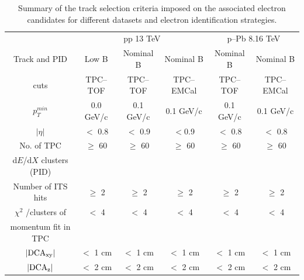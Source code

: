 \begin{table}[h]
\caption{Summary of the track selection criteria imposed on the associated electron candidates for different datasets and electron identification strategies.}

\centering
\small
\begin{tabular}{c |c c c | c c}
\hline\hline

 & \multicolumn{3}{c|}{pp 13 TeV} & \multicolumn{2}{c}{p--Pb 8.16 TeV}  \\ 
 Track and PID  & Low B & Nominal B  & Nominal B & Nominal B & Nominal B \\
  cuts & TPC--TOF & TPC--TOF  & TPC--EMCal & TPC--TOF & TPC--EMCal \\
\hline 
$p_{T}^{min}$ & 0.0 GeV/c   &{ 0.1 GeV/c}&   { 0.1 GeV/c}& 0.1 GeV/c &  0.1 GeV/c\\
$|\eta|$ & $<$ 0.8  &  { $<$ 0.9 } &  { $<$0.9 } & $<$ 0.8 & $<$ 0.8 \\
No. of TPC & $\geq$ 60  &$\geq$ 60 & $\geq$ 60 & $\geq$ 60 & $\geq$ 60\\
d$E$/d$X$ clusters (PID) & & &  & &\\
Number of ITS hits & $\geq$ 2 & $\geq$ 2& $\geq$ 2 & $\geq$ 2& $\geq$ 2\\

$\chi^{2}$ /clusters of & $<$ 4 &$<$ 4 & $<$ 4 &$<$ 4&$<$ 4\\
momentum fit in TPC &  &  &&\\
$|\rm DCA_{xy}|$ & $<$ 1 cm &$<$ 1 cm  & $<$ 1 cm & $<$ 1 cm& $<$ 1 cm\\
$|\rm DCA_{z}|$ & $<$ 2 cm & $<$ 2 cm & $<$ 2 cm & $<$ 2 cm & $<$ 2 cm\\

\hline
\end{tabular}
\label{Table:AssocatedTrackSelection}
\end{table}

